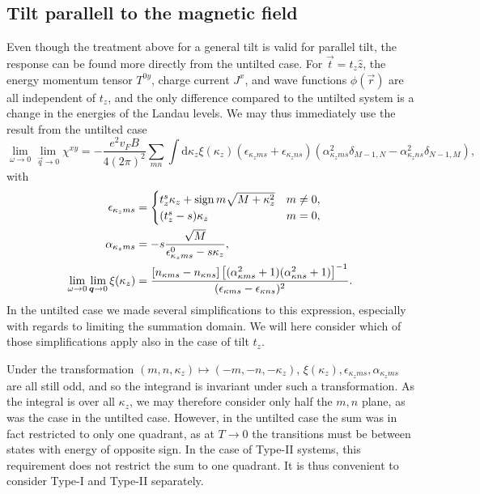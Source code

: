 \subsection{Tilt parallell to the magnetic field}
Even though the treatment above for a general tilt is valid for parallel tilt, the response can be found more directly from the untilted case.
For \( \vec{t} = t_z \hat{z} \), the energy momentum tensor \( T^{0y} \), charge current \( J^x \), and wave functions \( \phi(\vec{r}) \) are all independent of \( t_z \), and the only difference compared to the untilted system is a change in the energies of the Landau levels.
We may thus immediately use the result from the untilted case
\begin{equation}
  \label{eq:129}
  \lim_{\omega \to 0} \lim_{\vec{q} \to 0} \chi^{xy} =
  - \frac{e^2 v_F B}{4(2\pi)^2}
  \sum\limits_{mn} \int \mathrm{d} \kappa_z
  \xi(\kappa_z)
  (\epsilon_{\kappa_z m s} + \epsilon_{\kappa_z n s})
  (\alpha_{\kappa_z m s}^2 \delta_{M-1, N} - \alpha_{\kappa_z n s}^2 \delta_{N-1, M}),
\end{equation}
with
\begin{align}
  \label{eq:95}
  \epsilon_{\kappa_z m s} &=
                          \begin{cases}
                            t_z^s \kappa_z + \operatorname{sign}{m} \sqrt{M + \kappa_z^2} & m \neq 0,\\
                            (t_z^s - s) \kappa_z & m = 0,
                          \end{cases}\\
  \alpha_{\kappa_z m s} &=
                          -s \frac{\sqrt{M}}{\epsilon_{\kappa_z  m s}^0 - s \kappa_z },\\
  \lim_{\omega \to 0} \lim_{\bm{q} \to 0}\xi(\kappa_z) &= \frac{[n_{\kappa ms} - n_{\kappa ns}]
  \left[ (\alpha_{\kappa ms}^2 + 1) (\alpha_{\kappa ns}^2 + 1) \right]^{-1}
  }{
    (\epsilon _{\kappa m s} - \epsilon _{\kappa n s})^2
  }.
\end{align}
In the untilted case we made several simplifications to this expression, especially with regards to limiting the summation domain.
We will here consider which of those simplifications apply also in the case of tilt \( t_z \).

Under the transformation \( (m,n,\kappa_z) \mapsto (-m, -n , -\kappa_z) \), \( \xi(\kappa_z), \epsilon_{\kappa_z m s}, \alpha_{\kappa_z m s} \) are all still odd, and so the integrand is invariant under such a transformation.
As the integral is over all \( \kappa_z \), we may therefore consider only half the \( m,n \) plane, as was the case in the untilted case.
However, in the untilted case the sum was in fact restricted to only one quadrant, as at \( T\to 0 \) the transitions must be between states with energy of opposite sign.
In the case of Type-II systems, this requirement does not restrict the sum to one quadrant.
It is thus convenient to consider Type-I and Type-II separately.

